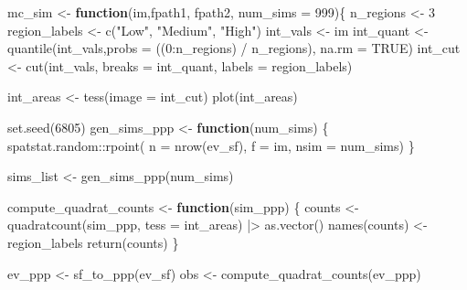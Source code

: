 \documentclass[
  letterpaper,
  DIV=11,
  numbers=noendperiod]{scrartcl}
\newenvironment{Shaded}{\begin{snugshade}}{\end{snugshade}}
\newcommand{\AttributeTok}[1]{\textcolor[rgb]{0.40,0.45,0.13}{#1}}
\newcommand{\ConstantTok}[1]{\textcolor[rgb]{0.56,0.35,0.01}{#1}}
\newcommand{\ControlFlowTok}[1]{\textcolor[rgb]{0.00,0.23,0.31}{\textbf{#1}}}
\newcommand{\DecValTok}[1]{\textcolor[rgb]{0.68,0.00,0.00}{#1}}
\newcommand{\FunctionTok}[1]{\textcolor[rgb]{0.28,0.35,0.67}{#1}}
\newcommand{\NormalTok}[1]{\textcolor[rgb]{0.00,0.23,0.31}{#1}}
\newcommand{\OtherTok}[1]{\textcolor[rgb]{0.00,0.23,0.31}{#1}}
\newcommand{\SpecialCharTok}[1]{\textcolor[rgb]{0.37,0.37,0.37}{#1}}
\newcommand{\StringTok}[1]{\textcolor[rgb]{0.13,0.47,0.30}{#1}}
\begin{document}
\begin{Shaded}
\begin{Highlighting}[]
\NormalTok{mc\_sim }\OtherTok{\textless{}{-}} \ControlFlowTok{function}\NormalTok{(im,fpath1, fpath2, }\AttributeTok{num\_sims =} \DecValTok{999}\NormalTok{)\{}
\NormalTok{  n\_regions }\OtherTok{\textless{}{-}} \DecValTok{3}
\NormalTok{  region\_labels }\OtherTok{\textless{}{-}} \FunctionTok{c}\NormalTok{(}\StringTok{"Low"}\NormalTok{, }\StringTok{"Medium"}\NormalTok{, }\StringTok{"High"}\NormalTok{)}
\NormalTok{  int\_vals }\OtherTok{\textless{}{-}}\NormalTok{ im}
\NormalTok{  int\_quant }\OtherTok{\textless{}{-}} \FunctionTok{quantile}\NormalTok{(int\_vals,}\AttributeTok{probs =}\NormalTok{ ((}\DecValTok{0}\SpecialCharTok{:}\NormalTok{n\_regions) }\SpecialCharTok{/}\NormalTok{ n\_regions), }\AttributeTok{na.rm =} \ConstantTok{TRUE}\NormalTok{)}
\NormalTok{  int\_cut }\OtherTok{\textless{}{-}} \FunctionTok{cut}\NormalTok{(int\_vals, }\AttributeTok{breaks =}\NormalTok{ int\_quant, }\AttributeTok{labels =}\NormalTok{ region\_labels)}

\NormalTok{  int\_areas }\OtherTok{\textless{}{-}} \FunctionTok{tess}\NormalTok{(}\AttributeTok{image =}\NormalTok{ int\_cut)}
  \FunctionTok{plot}\NormalTok{(int\_areas)}

  \FunctionTok{set.seed}\NormalTok{(}\DecValTok{6805}\NormalTok{)}
\NormalTok{  gen\_sims\_ppp }\OtherTok{\textless{}{-}} \ControlFlowTok{function}\NormalTok{(num\_sims) \{}
\NormalTok{    spatstat.random}\SpecialCharTok{::}\FunctionTok{rpoint}\NormalTok{(}
      \AttributeTok{n =} \FunctionTok{nrow}\NormalTok{(ev\_sf),}
      \AttributeTok{f =}\NormalTok{ im,}
      \AttributeTok{nsim =}\NormalTok{ num\_sims)}
\NormalTok{  \}}
  
\NormalTok{  sims\_list }\OtherTok{\textless{}{-}} \FunctionTok{gen\_sims\_ppp}\NormalTok{(num\_sims)}

\NormalTok{  compute\_quadrat\_counts }\OtherTok{\textless{}{-}} \ControlFlowTok{function}\NormalTok{(sim\_ppp) \{}
\NormalTok{    counts }\OtherTok{\textless{}{-}} \FunctionTok{quadratcount}\NormalTok{(sim\_ppp, }\AttributeTok{tess =}\NormalTok{ int\_areas) }\SpecialCharTok{|\textgreater{}} \FunctionTok{as.vector}\NormalTok{()}
    \FunctionTok{names}\NormalTok{(counts) }\OtherTok{\textless{}{-}}\NormalTok{ region\_labels}
    \FunctionTok{return}\NormalTok{(counts)}
\NormalTok{  \}}

\NormalTok{  ev\_ppp }\OtherTok{\textless{}{-}} \FunctionTok{sf\_to\_ppp}\NormalTok{(ev\_sf)}
\NormalTok{  obs }\OtherTok{\textless{}{-}} \FunctionTok{compute\_quadrat\_counts}\NormalTok{(ev\_ppp)}


\end{Highlighting}
\end{Shaded}
\end{document}
